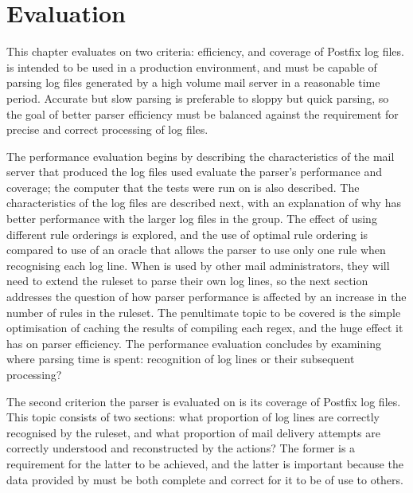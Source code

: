 \chapter{Evaluation}

\label{Evaluation}

\renewcommand{\figurename}{Graph}

\addtolength{\tabcolsep}{-2pt}

This chapter evaluates \parsername{} on two criteria: efficiency, and
coverage of  Postfix log files.  \parsername{} is intended to be used in a
production environment, and must be capable of parsing log files generated
by a high volume mail server in a reasonable time period.  Accurate but
slow parsing is preferable to sloppy but quick parsing, so the goal of
better parser efficiency must be balanced against the requirement for
precise and correct processing of log files.

The performance evaluation begins by describing the characteristics of the
mail server that produced the log files used evaluate the parser's
performance and coverage; the computer that the tests were run on is also
described.  The characteristics of the \numberOFlogFILES{} log files are
described next, with an explanation of why \parsername{} has better
performance with the larger log files in the group.  The effect of using
different rule orderings is explored, and the use of optimal rule ordering
is compared to use of an oracle that allows the parser to use only one rule
when recognising each log line.  When \parsername{} is used by other mail
administrators, they will need to extend the ruleset to parse their own log
lines, so the next section addresses the question of how parser performance
is affected by an increase in the number of rules in the ruleset.  The
penultimate topic to be covered is the simple optimisation of caching the
results of compiling each regex, and the huge effect it has on parser
efficiency.  The performance evaluation concludes by examining where
parsing time is spent: recognition of log lines or their subsequent
processing?

The second criterion the parser is evaluated on is its coverage of Postfix
log files.  This topic consists of two sections: what proportion of log
lines are correctly recognised by the ruleset, and what proportion of mail
delivery attempts are correctly understood and reconstructed by the
actions?  The former is a requirement for the latter to be achieved, and
the latter is important because the data provided by \parsername{} must be
both complete and correct for it to be of use to others.

